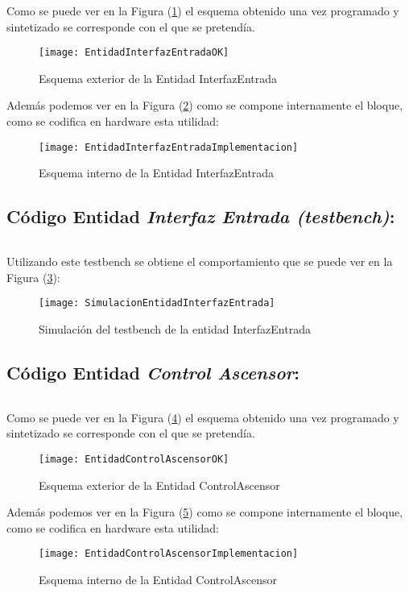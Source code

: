 	Como se puede ver en la Figura (\ref{fig:EntidadInterfazEntradaOK}) el esquema obtenido una vez programado y sintetizado se corresponde con el que se pretendía.
    \begin{figure}[H]
		    \centering
		    \texttt{[image: EntidadInterfazEntradaOK]}
		    \caption{Esquema exterior de la Entidad InterfazEntrada}
		    \label{fig:EntidadInterfazEntradaOK}
	\end{figure}
    Además podemos ver en la Figura (\ref{fig:EntidadInterfazEntradaImplementacion}) como se compone internamente el bloque, como se codifica en hardware esta utilidad:
    \begin{figure}[H]
		    \centering
		    \texttt{[image: EntidadInterfazEntradaImplementacion]}
		    \caption{Esquema interno de la Entidad InterfazEntrada}
		    \label{fig:EntidadInterfazEntradaImplementacion}
	\end{figure}

\subsection{Código Entidad \textit{Interfaz Entrada (testbench)}:} \label{code:InterfazEntrada_tb}
	\inputminted[frame=lines,fontsize=\footnotesize,linenos]{vhdl}{CodeFiles/EntidadInterfazEntrada_tb.vhd}

    Utilizando este testbench se obtiene el comportamiento que se puede ver en la Figura (\ref{fig:SimulacionEntidadInterfazEntrada}):

    \begin{figure}[H]
		    \centering
		    \texttt{[image: SimulacionEntidadInterfazEntrada]}
		    \caption{Simulación del testbench de la entidad InterfazEntrada}
		    \label{fig:SimulacionEntidadInterfazEntrada}
	\end{figure}

\subsection{Código Entidad \textit{Control Ascensor}:} \label{code:ControlAscensor}
	\inputminted[frame=lines,fontsize=\footnotesize,linenos]{vhdl}{CodeFiles/EntidadControlAscensor.vhd}

	Como se puede ver en la Figura (\ref{fig:EntidadControlAscensorOK}) el esquema obtenido una vez programado y sintetizado se corresponde con el que se pretendía.
    \begin{figure}[H]
		    \centering
		    \texttt{[image: EntidadControlAscensorOK]}
		    \caption{Esquema exterior de la Entidad ControlAscensor}
		    \label{fig:EntidadControlAscensorOK}
	\end{figure}
    Además podemos ver en la Figura (\ref{fig:EntidadControlAscensorImplementacion}) como se compone internamente el bloque, como se codifica en hardware esta utilidad:
    \begin{figure}[H]
		    \centering
		    \texttt{[image: EntidadControlAscensorImplementacion]}
		    \caption{Esquema interno de la Entidad ControlAscensor}
		    \label{fig:EntidadControlAscensorImplementacion}
	\end{figure}

